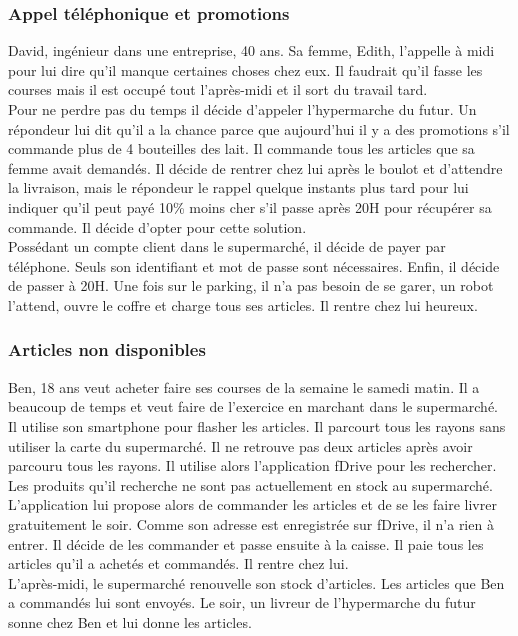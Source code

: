 				\subsubsection{Appel téléphonique et promotions}
					David, ingénieur dans une entreprise, 40 ans. Sa femme, Edith, l'appelle à midi pour lui dire qu'il manque certaines choses chez eux. Il faudrait qu'il fasse les courses mais il est occupé tout l'après-midi et il sort du travail tard.\\
					Pour ne perdre pas du temps il décide d'appeler l'\gls{hypermarche} du futur. Un répondeur lui dit qu'il a la chance parce que aujourd'hui il y a des promotions s'il commande plus de 4 bouteilles des lait. Il commande tous les articles que sa femme avait demandés. Il décide de rentrer chez lui après le boulot et d'attendre la livraison, mais le répondeur le rappel quelque instants plus tard pour lui indiquer qu'il peut payé 10\% moins cher s'il passe après 20H pour récupérer sa commande. Il décide d'opter pour cette solution.\\
					Possédant un compte client dans le supermarché, il décide de payer par téléphone. Seuls son identifiant et mot de passe sont nécessaires. Enfin, il décide de passer à 20H. Une fois sur le parking, il n'a pas besoin de se garer, un \gls{robot} l'attend, ouvre le coffre et charge tous ses articles. Il rentre chez lui heureux.
				\subsubsection{Articles non disponibles}
					Ben, 18 ans veut acheter faire ses courses de la semaine le samedi matin. Il a beaucoup de temps et veut faire de l'exercice en marchant dans le supermarché.\\
					Il utilise son \gls{smartphone} pour flasher les articles. Il parcourt tous les rayons sans utiliser la carte du supermarché. Il ne retrouve pas deux articles après avoir parcouru tous les rayons. Il utilise alors l'application fDrive pour les rechercher. Les produits qu'il recherche ne sont pas actuellement en stock au supermarché. L'application lui propose alors de commander les articles et de se les faire livrer gratuitement le soir. Comme son adresse est enregistrée sur fDrive, il n’a rien à entrer. Il décide de les commander et passe ensuite à la caisse. Il paie tous les articles qu'il a achetés et commandés. Il rentre chez lui.\\
L'après-midi, le supermarché renouvelle son stock d'articles. Les articles que Ben a commandés lui sont envoyés. Le soir, un livreur de l'\gls{hypermarche} du futur sonne chez Ben et lui donne les articles.

